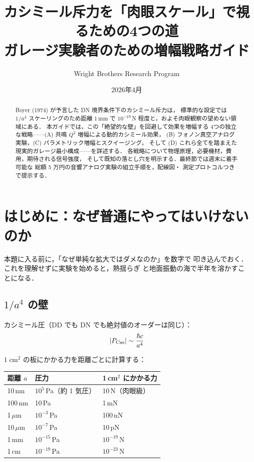 \documentclass[11pt,a4paper]{article}
\title{カシミール斥力を「肉眼スケール」で視るための4つの道\\
\large ガレージ実験者のための増幅戦略ガイド}
\author{Wright Brothers Research Program}
\date{2026年4月}
\begin{document}
\maketitle

\begin{abstract}
Boyer (1974) が予言した DN 境界条件下のカシミール斥力は，
標準的な設定では $1/a^4$ スケーリングのため距離 1\,mm で
$10^{-19}$\,N 程度と，およそ肉眼観察の望めない領域にある．
本ガイドでは，この「絶望的な壁」を回避して効果を増幅する
4つの独立な戦略——(A) 共鳴 $Q^2$ 増幅による動的カシミール効果，
(B) フォノン真空アナログ実験，(C) パラメトリック増幅とスクイージング，
そして (D) これら全てを踏まえた現実的ガレージ最小構成——を詳述する．
各戦略について物理原理，必要機材，費用，期待される信号強度，
そして既知の落とし穴を明示する．最終節では週末に着手可能な
総額 5 万円の音響アナログ実験の組立手順を，配線図・
測定プロトコルつきで提示する．
\end{abstract}

\tableofcontents

\section{はじめに：なぜ普通にやってはいけないのか}

本題に入る前に，「なぜ単純な拡大ではダメなのか」を数字で
叩き込んでおく．これを理解せずに実験を始めると，熱揺らぎ
と地面振動の海で半年を溶かすことになる．

\subsection{$1/a^4$ の壁}

カシミール圧（DD でも DN でも絶対値のオーダーは同じ）：
\begin{equation}
  |P_{\rm Cas}| \sim \frac{\hbar c}{a^4}
\end{equation}

$1\;\mathrm{cm}^2$ の板にかかる力を距離ごとに計算する：

\begin{center}
\begin{tabular}{lll}
\toprule
距離 $a$ & 圧力 & 1\,cm$^2$ にかかる力 \\
\midrule
10\,nm & $10^5$\,Pa（約 1 気圧）& 10\,N（肉眼級）\\
100\,nm & 10\,Pa & 1\,mN \\
1\,$\mu$m & $10^{-3}$\,Pa & 100\,nN \\
10\,$\mu$m & $10^{-7}$\,Pa & 10\,pN \\
1\,mm & $10^{-15}$\,Pa & $10^{-19}$\,N \\
1\,cm & $10^{-19}$\,Pa & $10^{-23}$\,N \\
\bottomrule
\end{tabular}
\end{center}
\end{document}
